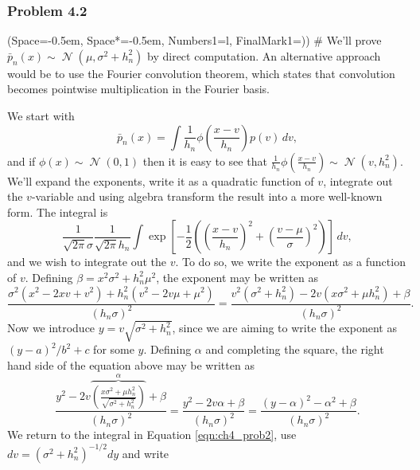 \documentclass[12pt, a4paper]{article}
\newcommand{\listSpace}{-0.5em}%
\DeclareMathOperator{\N}{\mathcal{N}}
\begin{document}
\subsubsection*{Problem 4.2}
\begin{easylist}[enumerate]
	\ListProperties(Space=\listSpace, Space*=\listSpace, Numbers1=l, FinalMark1={)})
	# We'll prove $\bar{p}_n(x) \sim \N(\mu, \sigma^2 + h_n^2)$ by direct computation. 
	An alternative approach would be to use the Fourier convolution theorem, which states that convolution becomes pointwise multiplication in the Fourier basis.
	
	We start with
	\begin{equation*}
	\bar{p}_n(x) = 	\int \frac{1}{h_n} \phi \left( \frac{x-v}{h_n} \right) p(v) \, dv,
	\end{equation*}
	and if $\phi(x) \sim \N(0, 1)$ then it is easy to see that $\frac{1}{h_n} \phi \left( \frac{x-v}{h_n} \right) \sim \N(v, h_n^2)$.
	We'll expand the exponents, write it as a quadratic function of $v$, integrate out the $v$-variable and using algebra transform the result into a more well-known form.
	The integral is
	\begin{equation}
	\label{eqn:ch4_prob2}
		\frac{1}{\sqrt{2 \pi} \sigma}
		\frac{1}{\sqrt{2 \pi} h_n}
		 \int \exp \left[ -\frac{1}{2} \left( 
		 \left(\frac{x-v}{h_n}\right)^2 + 
		 \left(\frac{v - \mu}{\sigma}\right)^2 
		 \right)\right] \, dv,
	\end{equation}
	and we wish to integrate out the $v$.
	To do so, we write the exponent as a function of $v$.
	Defining $\beta = x^2 \sigma^2 + h_n^2 \mu^2$, the exponent may be written as
	\begin{equation*}
		\frac{\sigma^2 \left( x^2 - 2xv + v^2 \right) + 
			h_n^2 \left( v^2 - 2v\mu + \mu^2 \right)}{(h_n \sigma)^2} = 
		\frac{v^2(\sigma^2 + h_n^2) - 2v (x\sigma^2 + \mu h_n^2) + \beta}{(h_n \sigma)^2}.
	\end{equation*}
	Now we introduce $y = v \sqrt{\sigma^2 + h_n^2}$, since we are aiming to write the exponent as $(y - a)^2 / b^2 + c$ for some $y$.
	Defining $\alpha$ and completing the square, the right hand side of the equation above may be written as
	\begin{equation*}
		\frac{y^2 - 2v  \overbrace{ \left(\frac{x \sigma^2 + \mu h_n^2}{\sqrt{\sigma^2 + h_n^2}} \right)}^\alpha  + \beta}{(h_n \sigma)^2}
		=
		\frac{y^2 - 2v \alpha + \beta}{(h_n \sigma)^2}
		=
		\frac{(y - \alpha)^2 - \alpha^2 + \beta}{(h_n \sigma)^2}.
	\end{equation*}
	We return to the integral in Equation \eqref{eqn:ch4_prob2}, use $dv = (\sigma^2 + h_n^2)^{-1/2} dy$ and write 

\end{easylist}
\end{document}
